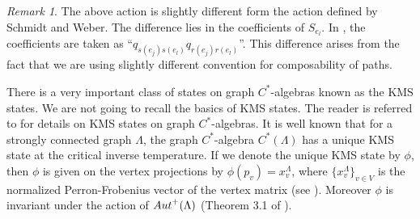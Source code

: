 \documentclass{amsart}
\theoremstyle{plain}
\newtheorem{proposition}[subsection]{Proposition}
\newtheorem{lemma}[subsection]{Lemma}
\theoremstyle{definition}
\theoremstyle{remark}
\newtheorem{remark}[subsection]{Remark}
\numberwithin{equation}{section}
\newcommand{\raro}{\rightarrow}
\begin{document}
\begin{remark}
    The above action is slightly different form the action defined by Schmidt and Weber.  The difference lies in the coefficients of $S_{e_{l}}$. In \cite{weber}, the coefficients are taken as ``$q_{s(e_{j})s(e_{l})}q_{r(e_{j})r(e_{l})}$''. This difference arises from the fact that we are using slightly different convention for composability of paths.
\end{remark}
There is a very important class of states on graph $C^{\ast}$-algebras known as the KMS states. We are not going to recall the basics of KMS states. The reader is referred to \cite{KMS} for details on KMS states on graph $C^{\ast}$-algebras. It is well known that for a strongly connected graph $\Lambda$, the graph $C^{\ast}$-algebra $C^{\ast}(\Lambda)$ has a unique KMS state at the critical inverse temperature. If we denote the unique KMS state by $\phi$, then $\phi$ is given on the vertex projections by $\phi(p_{v})=x^{\Lambda}_{v}$, where $\{x^{\Lambda}_{v}\}_{v\in V}$ is the normalized Perron-Frobenius vector of the vertex matrix (see \cite{seperable representation}). Moreover $\phi$ is invariant under the action of ${\rm Aut}^{+}(\Lambda)$ (Theorem 3.1 of \cite{joardar2}). 
\end{document}
